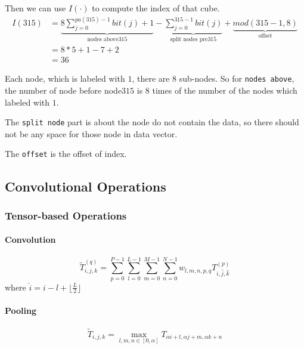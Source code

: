 \documentclass[border=0.5in]{blog}
\begin{document}
    Then we can use $I(\cdot)$ to compute the index of that cube.
    \begin{align*}
    I(315) &= \underbrace{8 \sum\limits_{j=0}^{pa(315)-1}bit(j)+1}_{\text{nodes above} 315}
           - \underbrace{\sum\limits_{j=0}^{315-1}bit(j)}_{\text{split nodes pre} 315}
           + \underbrace{mod(315-1,8)}_\text{offset}\\
           &= 8 * 5 + 1 - 7 + 2 \\
           &= 36
    \end{align*}
    
    Each node, which is labeled with $1$, there are 8 sub-nodes.
    So for \verb|nodes above|, the number of node before node$315$ is $8$ times of the number
    of the nodes which labeled with $1$.
    
    The \verb|split node| part is about the node do not contain the data, so there should not
    be any space for those node in data vector.
    
    The \verb|offset| is the offset of index.
    
    
    \subsection{Convolutional Operations}
    \label{sec:octnet:co}
    
    \subsubsection{Tensor-based Operations}
    \label{sec:octnet:co:tb}
    
    \paragraph{Convolution}
        \begin{equation}
        \tilde{T}^{(q)}_{i,j,k} = \sum\limits_{p=0}^{P-1} \sum\limits_{l=0}^{L-1} \sum\limits_{m=0}^{M-1} \sum\limits_{n = 0}^{N-1} w_{l,m,n,p,q}T^{(p)}_{\hat{i},\hat{j},\hat{k}}
        \end{equation}
        where $\hat{i} = i -l + \lfloor\frac{L}{2}\rfloor$
    \paragraph{Pooling}
    \begin{equation}
    \tilde{T}_{i,j,k} = \max\limits_{l,m,n \in \left[0,\alpha\right]}T_{\alpha i +l,\alpha j +m,\alpha k +n}
    \end{equation}
    
\end{document}
